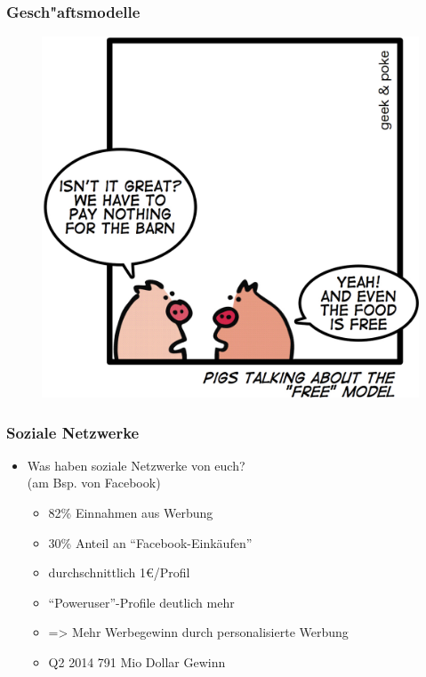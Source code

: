 \documentclass[12pt]{beamer}
\begin{document}
\begin{frame}
  \frametitle{Gesch"aftsmodelle}
  \begin{figure}
    \includegraphics[height=0.7\textheight]{img/business_pigs.jpg}
  \end{figure}
\end{frame}

\begin{frame}
  \frametitle{Soziale Netzwerke}

  \begin{itemize}
    \item Was haben soziale Netzwerke von euch?\\(am Bsp. von Facebook)
      \begin{itemize}
        \item<2-> 82\% Einnahmen aus Werbung
        \item<3-> 30\% Anteil an "`Facebook-Einkäufen"'
        \item<4-> durchschnittlich 1€/Profil
        \item<5-> "`Poweruser"'-Profile deutlich mehr
        \item<6-> => Mehr Werbegewinn durch personalisierte Werbung
        \item<7-> Q2 2014 791 Mio Dollar Gewinn
      \end{itemize}
  \end{itemize}
\end{frame}
\end{document}
